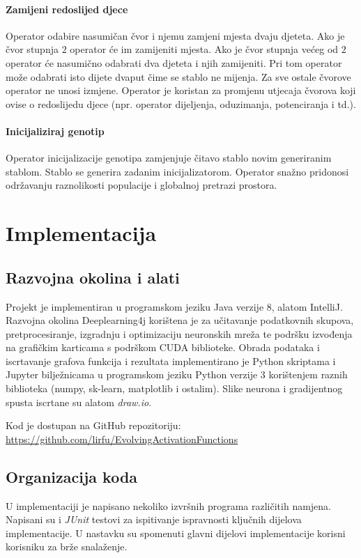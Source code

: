 \documentclass[times, utf8, numeric, diplomski]{fer}
\begin{document}
\subsubsection{Zamijeni redoslijed djece}
Operator odabire nasumičan čvor i njemu zamjeni mjesta dvaju djeteta. Ako je čvor stupnja $2$ operator će im zamijeniti mjesta. Ako je čvor stupnja većeg od $2$ operator će nasumično odabrati dva djeteta i njih zamijeniti. Pri tom operator može odabrati isto dijete dvaput čime se stablo ne mijenja. Za sve ostale čvorove operator ne unosi izmjene. Operator je koristan za promjenu utjecaja čvorova koji ovise o redoslijedu djece (npr. operator dijeljenja, oduzimanja, potenciranja i td.).

\subsubsection{Inicijaliziraj genotip}
Operator inicijalizacije genotipa zamjenjuje čitavo stablo novim generiranim stablom. Stablo se generira zadanim inicijalizatorom. Operator snažno pridonosi održavanju raznolikosti populacije i globalnoj pretrazi prostora.


\chapter{Implementacija}
\section{Razvojna okolina i alati}
Projekt je implementiran u programskom jeziku Java verzije 8, alatom IntelliJ. Razvojna okolina Deeplearning4j \citep{dl4j} korištena je za učitavanje podatkovnih skupova, pretprocesiranje, izgradnju i optimizaciju neuronskih mreža te podršku izvođenja na grafičkim karticama s podrškom CUDA biblioteke. Obrada podataka i iscrtavanje grafova funkcija i rezultata implementirano je Python skriptama i Jupyter bilježnicama u programskom jeziku Python verzije 3 korištenjem raznih biblioteka (numpy, sk-learn, matplotlib i ostalim). Slike neurona i gradijentnog spusta iscrtane su alatom \textit{draw.io}.

\noindent
Kod je dostupan na GitHub repozitoriju: \\
\url{https://github.com/lirfu/EvolvingActivationFunctions}

\section{Organizacija koda}
U implementaciji je napisano nekoliko izvršnih programa različitih namjena. Napisani su i \textit{JUnit} testovi za ispitivanje ispravnosti ključnih dijelova implementacije. U nastavku su spomenuti glavni dijelovi implementacije korisni korisniku za brže snalaženje.
\end{document}
